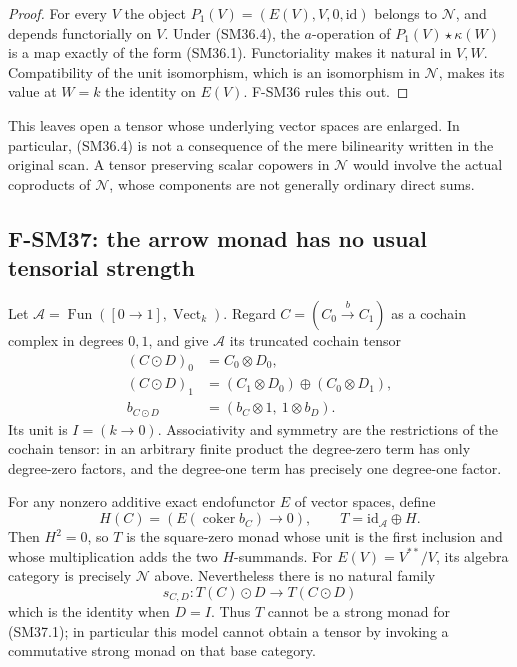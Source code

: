 \begin{proof}
For every \(V\) the object
\(P_1(V)=(E(V),V,0,\mathrm{id})\) belongs to \(\mathcal N\),
and depends functorially on \(V\).  Under (SM36.4), the
\(a\)-operation of \(P_1(V)\star\kappa(W)\) is a map
exactly of the form (SM36.1).  Functoriality makes it natural
in \(V,W\).  Compatibility of the unit isomorphism, which is
an isomorphism in \(\mathcal N\), makes its value at \(W=k\)
the identity on \(E(V)\).  F-SM36 rules this out.
\end{proof}

This leaves open a tensor whose underlying vector spaces are
enlarged.  In particular, (SM36.4) is not a consequence of the
mere bilinearity written in the original scan.  A tensor
preserving scalar copowers in \(\mathcal N\) would involve
the actual coproducts of \(\mathcal N\), whose components
are not generally ordinary direct sums.

\subsection{F-SM37: the arrow monad has no usual tensorial strength}

Let \(\mathcal A=\operatorname{Fun}([0\to1],\operatorname{Vect}_k)\).
Regard \(C=(C_0\xrightarrow{b}C_1)\) as a cochain complex
in degrees \(0,1\), and give \(\mathcal A\) its truncated
cochain tensor
\[
 \begin{aligned}
 (C\odot D)_0&=C_0\otimes D_0,\\
 (C\odot D)_1&=(C_1\otimes D_0)\oplus(C_0\otimes D_1),\\
 b_{C\odot D}&=(b_C\otimes1,\ 1\otimes b_D).
 \end{aligned}                                               \tag{SM37.1}
\]
Its unit is \(I=(k\to0)\).  Associativity and symmetry are
the restrictions of the cochain tensor: in an arbitrary finite
product the degree-zero term has only degree-zero factors, and
the degree-one term has precisely one degree-one factor.

For any nonzero additive exact endofunctor \(E\) of vector
spaces, define
\[
 H(C)=(E(\operatorname{coker}b_C)\to0),\qquad
 T=\mathrm{id}_{\mathcal A}\oplus H.                         \tag{SM37.2}
\]
Then \(H^2=0\), so \(T\) is the square-zero monad whose unit
is the first inclusion and whose multiplication adds the two
\(H\)-summands.  For \(E(V)=V^{**}/V\), its algebra category
is precisely \(\mathcal N\) above.  Nevertheless there is no
natural family
\[
       s_{C,D}:T(C)\odot D\longrightarrow T(C\odot D)
                                                               \tag{SM37.3}
\]
which is the identity when \(D=I\).  Thus \(T\) cannot be
a strong monad for (SM37.1); in particular this model cannot
obtain a tensor by invoking a commutative strong monad on that
base category.


